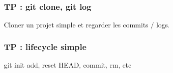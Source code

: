 \begin{frame}[fragile]\frametitle{TP : git clone, git log}
  Cloner un projet simple et regarder les commits / logs.
\end{frame}
\begin{frame}[fragile]\frametitle{TP : lifecycle simple}
  git init
  add, reset HEAD, commit, rm, etc
\end{frame}

